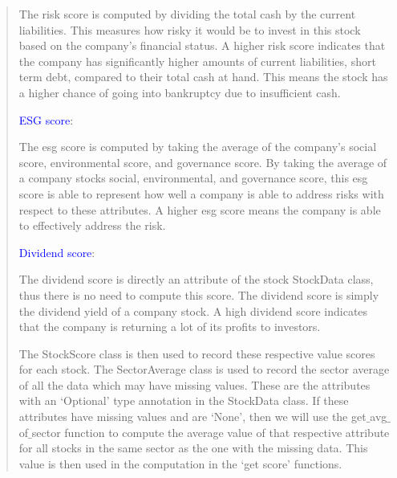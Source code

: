 \documentclass[fontsize=12pt]{article}
\begin{document}
\begin{quote}
The risk score is computed by dividing the total cash by the current liabilities. This measures how risky it would be to invest in this stock based on the company’s financial status. A higher risk score indicates that the company has significantly higher amounts of current liabilities, short term debt, compared to their total cash at hand. This means the stock has a higher chance of going into
bankruptcy due to insufficient cash.

\textcolor{blue}{ESG score}:

The esg score is computed by taking the average of the company's social score, environmental score, and governance score. By taking the average of a company stocks social, environmental, and governance score, this esg score is able
to represent how well a company is able to address risks with respect to these attributes. A higher esg score means the company is able to effectively address the risk.

\textcolor{blue}{Dividend score}:

The dividend score is directly an attribute of the stock StockData class, thus there is no need to compute this score. The dividend score is simply the dividend yield of a company stock. A high dividend score indicates that the company is returning a lot of its profits to investors. 

The StockScore class is then used to record these respective value scores for each stock. The SectorAverage class is used to record the sector average of all the data which may have missing values. These are the attributes with an ‘Optional’ type annotation in the StockData class. If these attributes have missing values and are ‘None’, then we will use the get$\_$avg$\_$of$\_$sector function to compute the average value of that respective attribute for all stocks in the same sector as the one with the missing data. This value is then used in the computation in the ‘get score’ functions. 
\end{quote}
\end{document}
